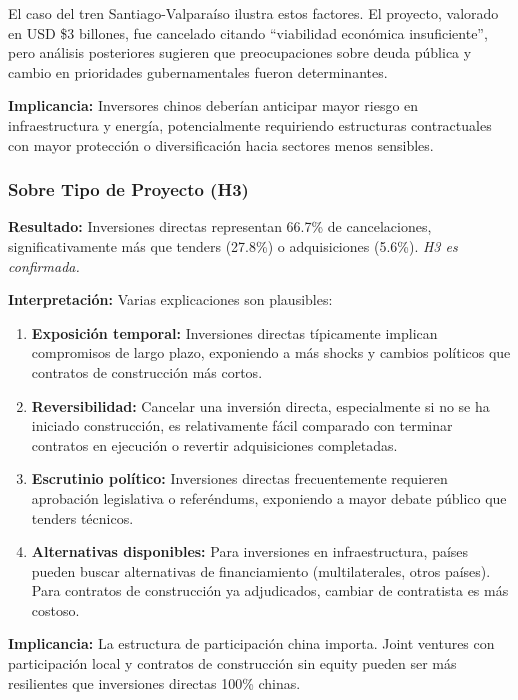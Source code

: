 \documentclass[12pt]{article}
\begin{document}
El caso del tren Santiago-Valparaíso ilustra estos factores. El proyecto, valorado en USD \$3 billones, fue cancelado citando ``viabilidad económica insuficiente'', pero análisis posteriores sugieren que preocupaciones sobre deuda pública y cambio en prioridades gubernamentales fueron determinantes.

\textbf{Implicancia:} Inversores chinos deberían anticipar mayor riesgo en infraestructura y energía, potencialmente requiriendo estructuras contractuales con mayor protección o diversificación hacia sectores menos sensibles.

\subsubsection{Sobre Tipo de Proyecto (H3)}

\textbf{Resultado:} Inversiones directas representan 66.7\% de cancelaciones, significativamente más que tenders (27.8\%) o adquisiciones (5.6\%). \textit{H3 es confirmada.}

\textbf{Interpretación:} Varias explicaciones son plausibles:

\begin{enumerate}
    \item \textbf{Exposición temporal:} Inversiones directas típicamente implican compromisos de largo plazo, exponiendo a más shocks y cambios políticos que contratos de construcción más cortos.
    
    \item \textbf{Reversibilidad:} Cancelar una inversión directa, especialmente si no se ha iniciado construcción, es relativamente fácil comparado con terminar contratos en ejecución o revertir adquisiciones completadas.
    
    \item \textbf{Escrutinio político:} Inversiones directas frecuentemente requieren aprobación legislativa o referéndums, exponiendo a mayor debate público que tenders técnicos.
    
    \item \textbf{Alternativas disponibles:} Para inversiones en infraestructura, países pueden buscar alternativas de financiamiento (multilaterales, otros países). Para contratos de construcción ya adjudicados, cambiar de contratista es más costoso.
\end{enumerate}

\textbf{Implicancia:} La estructura de participación china importa. Joint ventures con participación local y contratos de construcción sin equity pueden ser más resilientes que inversiones directas 100\% chinas.
\end{document}
